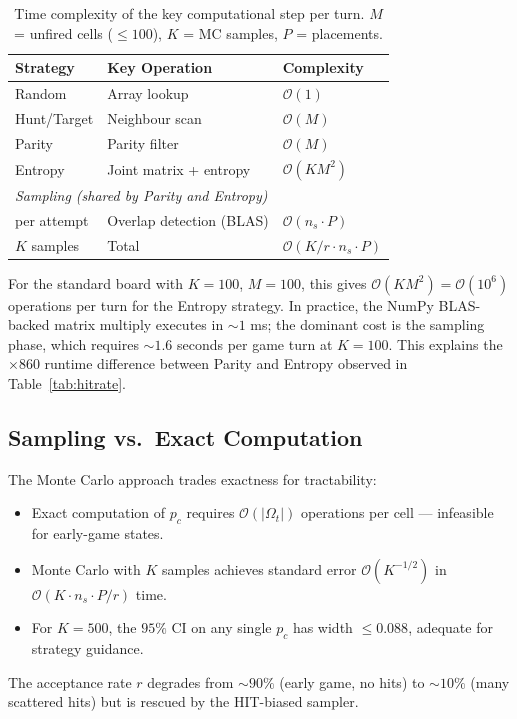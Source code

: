 \documentclass[12pt,a4paper]{article}
\newcommand{\1}{\mathbf{1}}
\newcommand{\bigo}{\mathcal{O}}
\begin{document}
\begin{table}[H]
  \centering
  \caption{Time complexity of the key computational step per turn.
           $M$ = unfired cells ($\leq 100$), $K$ = MC samples, $P$ = placements.}
  \label{tab:complexity}
  \begin{tabular}{lll}
    \toprule
    Strategy      & Key Operation            & Complexity \\
    \midrule
    Random        & Array lookup             & $\bigo(1)$ \\
    Hunt/Target   & Neighbour scan           & $\bigo(M)$ \\
    Parity        & Parity filter            & $\bigo(M)$ \\
    Entropy       & Joint matrix + entropy   & $\bigo(KM^2)$ \\
    \midrule
    \multicolumn{3}{l}{\emph{Sampling (shared by Parity and Entropy)}} \\
    \quad per attempt & Overlap detection (BLAS) & $\bigo(n_s \cdot P)$ \\
    \quad $K$ samples & Total                & $\bigo(K/r \cdot n_s \cdot P)$ \\
    \bottomrule
  \end{tabular}
\end{table}

\noindent For the standard board with $K = 100$, $M = 100$, this gives
$\bigo(KM^2) = \bigo(10^6)$ operations per turn for the Entropy strategy.
In practice, the NumPy BLAS-backed matrix multiply executes in $\sim 1$ ms;
the dominant cost is the sampling phase, which requires $\sim 1.6$ seconds
per game turn at $K = 100$.  This explains the $\times 860$ runtime difference
between Parity and Entropy observed in Table~\ref{tab:hitrate}.

\subsection{Sampling vs.\ Exact Computation}

The Monte Carlo approach trades exactness for tractability:
\begin{itemize}[nosep]
  \item Exact computation of $p_c$ requires $\bigo(|\Omega_t|)$ operations per
        cell --- infeasible for early-game states.
  \item Monte Carlo with $K$ samples achieves standard error $\bigo(K^{-1/2})$
        in $\bigo(K \cdot n_s \cdot P / r)$ time.
  \item For $K = 500$, the $95\%$ CI on any single $p_c$ has width $\leq 0.088$,
        adequate for strategy guidance.
\end{itemize}
The acceptance rate $r$ degrades from $\sim 90\%$ (early game, no hits) to
$\sim 10\%$ (many scattered hits) but is rescued by the HIT-biased sampler.
\end{document}
